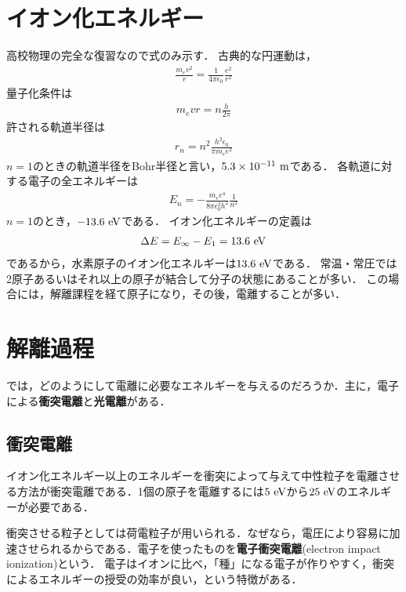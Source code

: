 \documentclass{report}
\begin{document}
  \section{イオン化エネルギー}
    高校物理の完全な復習なので式のみ示す．
    古典的な円運動は，
    \begin{align}
      \frac{m_ev^2}{r} = \frac{1}{4\pi\epsilon_0}\frac{e^2}{r^2}
    \end{align}
    量子化条件は
    \begin{align}
      m_e vr = n\frac{h}{2\pi}
    \end{align}
    許される軌道半径は
    \begin{align}
      r_n = n^2 \frac{h^2\epsilon_0}{\pi m_e e^2}
    \end{align}
    $n = 1$のときの軌道半径をBohr半径と言い，$5.3 \times 10^{-11}\ \mathrm{m}$である．
    各軌道に対する電子の全エネルギーは
    \begin{align}
      E_n = -\frac{m_ee^4}{8\pi\epsilon_0^2h^2}\frac{1}{n^2}
    \end{align}
    $n=1$のとき，$-13.6\ \mathrm{eV}$である．
    イオン化エネルギーの定義は
    \begin{align}
      \Delta E = E_{\infty} - E_1 = 13.6\ \mathrm{eV}
    \end{align}
    であるから，水素原子のイオン化エネルギーは$13.6\ \mathrm{eV}$である．
    常温・常圧では2原子あるいはそれ以上の原子が結合して分子の状態にあることが多い．
    この場合には，解離課程を経て原子になり，その後，電離することが多い．
  \section{解離過程}
    では，どのようにして電離に必要なエネルギーを与えるのだろうか．主に，電子による\textbf{衝突電離}と\textbf{光電離}がある．

    \subsection{衝突電離}
    イオン化エネルギー以上のエネルギーを衝突によって与えて中性粒子を電離させる方法が衝突電離である．1個の原子を電離するには$5\ \mathrm{eV}$から$25\ \r{eV}$のエネルギーが必要である．

    衝突させる粒子としては荷電粒子が用いられる．なぜなら，電圧により容易に加速させられるからである．電子を使ったものを\textbf{電子衝突電離}(electron impact ionization)という．
    電子はイオンに比べ，「種」になる電子が作りやすく，衝突によるエネルギーの授受の効率が良い，という特徴がある．
\end{document}
